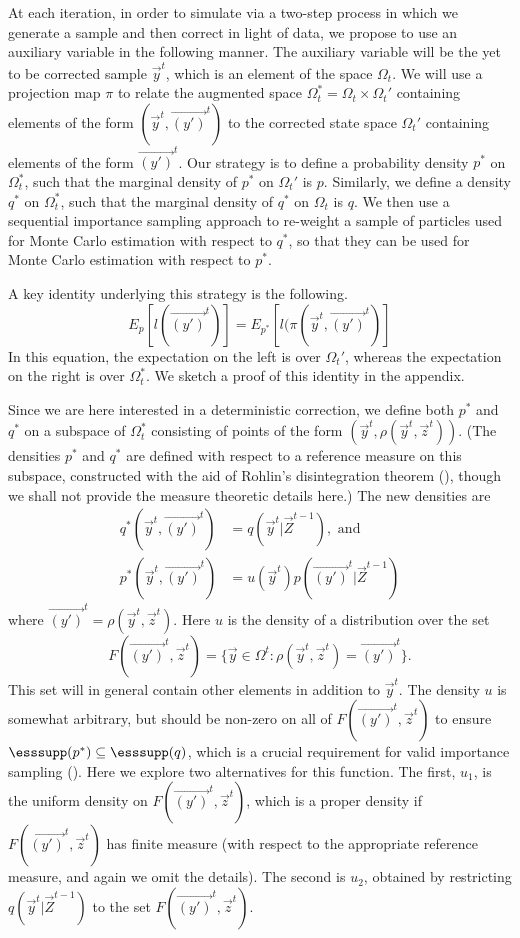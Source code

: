 At each iteration, in order to simulate via a two-step process in which we generate a sample and then correct in light of data, we propose to use an auxiliary variable in the following manner. The auxiliary variable will be the yet to be corrected sample $\vec{y}^{t}$, which is an element of the space $\Omega_t$. We will use a projection map $\pi$ to relate the augmented space $\Omega^*_t = \Omega_t \times \Omega_t'$ containing elements of the form $(\vec{y}^{t}, \vec{(y')}^{t})$ to the corrected state space $\Omega_t'$ containing elements of the form $\vec{(y')}^{t}$. Our strategy is to define a probability density $p^*$ on $\Omega^*_t$, such that the marginal density of $p^*$ on $\Omega_t'$ is $p$. Similarly, we define a density $q^*$ on $\Omega^*_t$, such that the marginal density of $q^*$ on $\Omega_t$ is $q$. We then use a sequential importance sampling approach to re-weight a sample of particles used for Monte Carlo estimation with respect to $q^*$, so that they can be used for Monte Carlo estimation with respect to $p^*$.

A key identity underlying this strategy is the following.
\[
E_{p}[l(\vec{(y')}^{t})]  =  E_{p^*}[l(\pi (\vec{y}^{t}, \vec{(y')}^{t})]
\]
In this equation, the expectation on the left is over $\Omega_t'$, whereas the expectation on the right is over $\Omega_t^*$. We sketch a proof of this identity in the appendix.

Since we are here interested in a deterministic correction, we define both $p^*$ and $q^*$ on a subspace of $\Omega_t^*$ consisting of points of the form $(\vec{y}^{t}, \rho(\vec{y}^{t}, \vec{z}^{t}))$. (The densities $p^*$ and $q^*$ are defined with respect to a reference measure on this subspace, constructed with the aid of Rohlin's disintegration theorem (\cite{Rohlin}), though we shall not provide the measure theoretic details here.) The new densities are
\begin{align*}
q^*(\vec{y}^{t},\vec{(y')}^{t}) &= q(\vec{y}^{t} | \vec{Z}^{t-1}), \mbox{ and } \\
p^*(\vec{y}^{t},\vec{(y')}^{t}) &= u(\vec{y}^{t}) p(\vec{(y')}^{t} | \vec{Z}^{t-1})
\end{align*}
where $\vec{(y')}^{t} = \rho(\vec{y}^{t}, \vec{z}^{t})$. Here $u$ is the density of a distribution over the set 
\[
F({\vec{(y')}^{t}, \vec{z}^{t}}) = \{ \vec{y} \in \Omega^t  :  \rho(\vec{y}^{t}, \vec{z}^{t}) = \vec{(y')}^{t} \}.
\]
This set will in general contain other elements in addition to $\vec{y}^{t}$. 
The density $u$ is somewhat arbitrary, but should be non-zero on all of $F({\vec{(y')}^{t}, \vec{z}^{t}})$ to ensure $\esssupp(p^*) \subseteq \esssupp(q)$, which is a crucial requirement for valid importance sampling (\cite{Geweke}). Here we explore two alternatives for this function. The first, $u_1$, is the uniform density on $F({\vec{(y')}^{t}, \vec{z}^{t}})$, which is a proper density if $F({\vec{(y')}^{t}, \vec{z}^{t}})$ has finite measure (with respect to the appropriate reference measure, and again we omit the details). The second is $u_2$, obtained by restricting $q(\vec{y}^{t} | \vec{Z}^{t-1})$ to the set $F({\vec{(y')}^{t}, \vec{z}^{t}})$.


